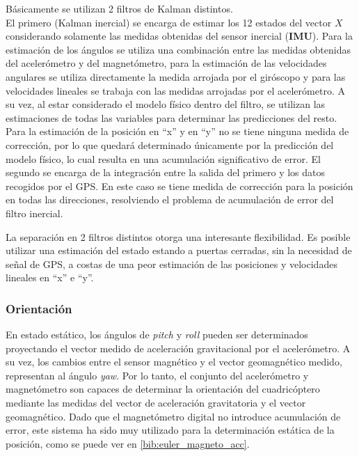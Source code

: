 \documentclass[main]{subfiles}
\begin{document}
Básicamente se utilizan 2 filtros de Kalman distintos.\\
El primero (Kalman inercial) se encarga de estimar los 12 estados del vector $X$ considerando solamente las medidas obtenidas del sensor inercial (\textbf{IMU}). Para la estimación de los ángulos se utiliza una combinación entre las medidas obtenidas del acelerómetro y del magnetómetro, para la estimación de las velocidades angulares se utiliza directamente la medida arrojada por el giróscopo y para las velocidades lineales se trabaja con las medidas arrojadas por el acelerómetro. A su vez, al estar considerado el modelo físico dentro del filtro, se utilizan las estimaciones de todas las variables para determinar las predicciones del resto. Para la estimación de la posición en ``x'' y en ``y'' no se tiene ninguna medida de corrección, por lo que quedará determinado únicamente por la predicción del modelo físico, lo cual resulta en una acumulación significativo de error.
El segundo se encarga de la integración entre la salida del primero y los datos recogidos por el GPS. En este caso se tiene medida de corrección para la posición en todas las direcciones, resolviendo el problema de acumulación de error del filtro inercial.


La separación en 2 filtros distintos otorga una interesante flexibilidad. Es posible utilizar una estimación del estado estando a puertas cerradas, sin la necesidad de señal de GPS, a costas de una peor estimación de las posiciones y velocidades lineales en ``x'' e ``y''.

\subsubsection*{Orientación}

En estado estático, los ángulos de \emph{pitch} y \emph{roll} pueden ser determinados proyectando el vector medido de aceleración gravitacional por el acelerómetro. A su vez, los cambios entre el sensor magnético y el vector geomagnético medido, representan al ángulo \emph{yaw}. Por lo tanto, el conjunto del acelerómetro y magnetómetro son capaces de determinar la orientación del cuadricóptero mediante las medidas del vector de aceleración gravitatoria y el vector geomagnético. Dado que el magnetómetro digital no introduce acumulación de error, este sistema ha sido muy utilizado para la determinación estática de la posición, como se puede ver en \ref{bib:euler_magneto_acc}.

\end{document}
